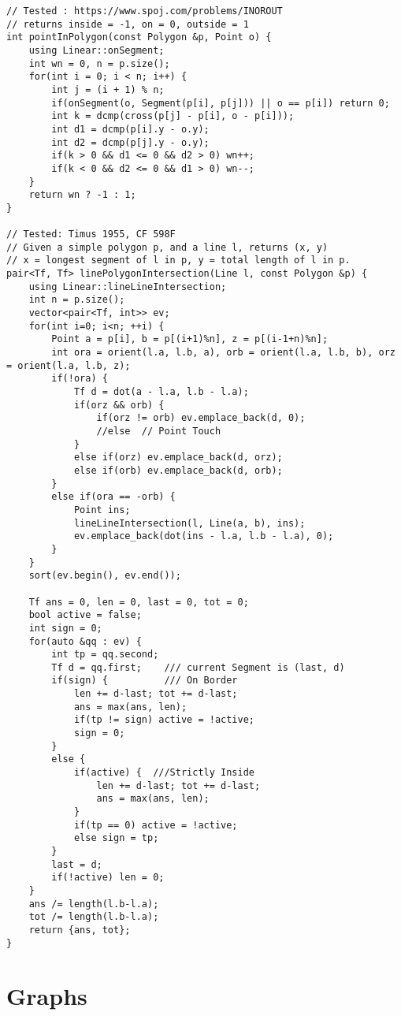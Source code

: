 \documentclass[FSZ,a4paper,onesided]{article}
\begin{document}
\begin{multicols*}{\COLS}
\begin{lstlisting}
// Tested : https://www.spoj.com/problems/INOROUT
// returns inside = -1, on = 0, outside = 1
int pointInPolygon(const Polygon &p, Point o) {
    using Linear::onSegment;
    int wn = 0, n = p.size();
    for(int i = 0; i < n; i++) {
        int j = (i + 1) % n;
        if(onSegment(o, Segment(p[i], p[j])) || o == p[i]) return 0;
        int k = dcmp(cross(p[j] - p[i], o - p[i]));
        int d1 = dcmp(p[i].y - o.y);
        int d2 = dcmp(p[j].y - o.y);
        if(k > 0 && d1 <= 0 && d2 > 0) wn++;
        if(k < 0 && d2 <= 0 && d1 > 0) wn--;
    }
    return wn ? -1 : 1;
}

// Tested: Timus 1955, CF 598F
// Given a simple polygon p, and a line l, returns (x, y)
// x = longest segment of l in p, y = total length of l in p.
pair<Tf, Tf> linePolygonIntersection(Line l, const Polygon &p) {
    using Linear::lineLineIntersection;
    int n = p.size();
    vector<pair<Tf, int>> ev;
    for(int i=0; i<n; ++i) {
        Point a = p[i], b = p[(i+1)%n], z = p[(i-1+n)%n];
        int ora = orient(l.a, l.b, a), orb = orient(l.a, l.b, b), orz = orient(l.a, l.b, z);
        if(!ora) {
            Tf d = dot(a - l.a, l.b - l.a);
            if(orz && orb) {
                if(orz != orb) ev.emplace_back(d, 0);
                //else  // Point Touch
            }
            else if(orz) ev.emplace_back(d, orz);
            else if(orb) ev.emplace_back(d, orb);
        }
        else if(ora == -orb) {
            Point ins;
            lineLineIntersection(l, Line(a, b), ins);
            ev.emplace_back(dot(ins - l.a, l.b - l.a), 0);
        }
    }
    sort(ev.begin(), ev.end());

    Tf ans = 0, len = 0, last = 0, tot = 0;
    bool active = false;
    int sign = 0;
    for(auto &qq : ev) {
        int tp = qq.second;
        Tf d = qq.first;    /// current Segment is (last, d)
        if(sign) {          /// On Border
            len += d-last; tot += d-last;
            ans = max(ans, len);
            if(tp != sign) active = !active;
            sign = 0;
        }
        else {
            if(active) {  ///Strictly Inside
                len += d-last; tot += d-last;
                ans = max(ans, len);
            }
            if(tp == 0) active = !active;
            else sign = tp;
        }
        last = d;
        if(!active) len = 0;
    }
    ans /= length(l.b-l.a);
    tot /= length(l.b-l.a);
    return {ans, tot};
}\end{lstlisting}
\section{Graphs}

\end{multicols*}
\end{document}
